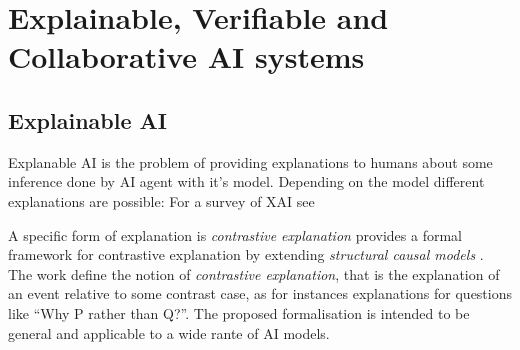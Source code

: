 \section{Explainable, Verifiable and Collaborative AI systems} 

\subsection{Explainable AI} Explanable AI is the problem of providing
explanations to humans about some inference done by AI agent with it's
model. Depending on the model different explanations are possible:
For a survey of XAI see \cite{arrieta2020explainable}

A specific form of explanation is \emph{contrastive explanation}
\cite{miller2018contrastive} provides a formal framework for
contrastive explanation by extending \emph{structural causal models}
\cite{halpern2005causes1}.  The work define the notion of
\emph{contrastive explanation}, 
that is the explanation of an event relative to some contrast case, as
for instances explanations for questions like ``Why P rather than
Q?''. The proposed formalisation is intended to be general and
applicable to a wide rante of AI models.

